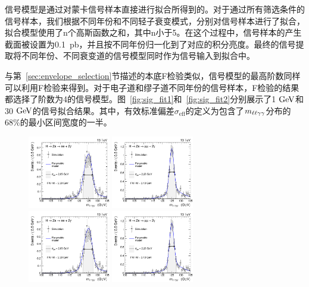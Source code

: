 信号模型是通过对蒙卡信号样本直接进行拟合所得到的。对于通过所有筛选条件的信号样本，我们根据不同年份和不同轻子衰变模式，分别对信号样本进行了拟合，拟合模型使用了n个高斯函数之和，其中n小于5。在这个过程中，信号样本的产生截面被设置为0.1~\si{pb}，并且按不同年份归一化到了对应的积分亮度。最终的信号提取将不同年份、不同衰变道的信号模型同时作为信号输入到拟合中。

与第~\ref{sec:envelope_selection}节描述的本底F检验类似，信号模型的最高阶数同样可以利用F检验来得到。对于电子道和缪子道不同年份的信号样本，F检验的结果都选择了阶数为4的信号模型。图~\ref{fig:sig_fit1}和~\ref{fig:sig_fit2}分别展示了1$\GeV$和30$\GeV$的信号拟合结果。其中，有效标准偏差$\sigma_{\mathrm{eff}}$的定义为包含了$m_{\ell\ell\gamma\gamma}$分布的68\%的最小区间宽度的一半。

\begin{figure}[htbp]
  \begin{center}
		\includegraphics[width=0.32\textwidth,page=1]{figures/chapter04/sig_model/sigModel_M1_ele.pdf}
        \includegraphics[width=0.32\textwidth,page=1]{figures/chapter04/sig_model/sigModel_M1_mu.pdf} \\
		\includegraphics[width=0.32\textwidth,page=2]{figures/chapter04/sig_model/sigModel_M1_ele.pdf}
		\includegraphics[width=0.32\textwidth,page=2]{figures/chapter04/sig_model/sigModel_M1_mu.pdf}\\

\end{center}
\end{figure}
